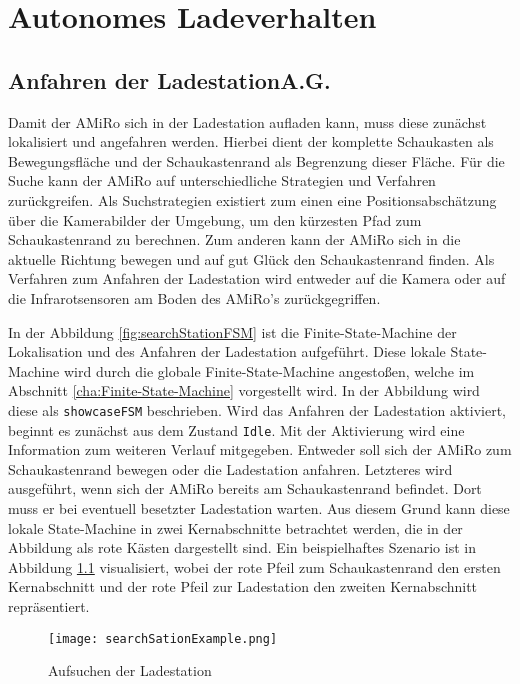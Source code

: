\chapter{Autonomes Ladeverhalten} \label{kap:AutonomesLadeverhalten}

\section[Anfahren der Ladestation]{Anfahren der Ladestation\hfill {\normalsize A.G.}} %

Damit der AMiRo sich in der Ladestation aufladen kann, muss diese zunächst lokalisiert und angefahren werden. Hierbei dient der komplette Schaukasten als Bewegungsfläche und der Schaukastenrand als Begrenzung dieser Fläche. Für die Suche kann der AMiRo auf unterschiedliche Strategien und Verfahren zurückgreifen. Als Suchstrategien existiert zum einen eine Positionsabschätzung über die Kamerabilder der Umgebung, um den kürzesten Pfad zum Schaukastenrand zu berechnen. Zum anderen kann der AMiRo sich in die aktuelle Richtung bewegen und auf gut Glück den Schaukastenrand finden. Als Verfahren zum Anfahren der Ladestation wird entweder auf die Kamera oder auf die Infrarotsensoren am Boden des AMiRo's zurückgegriffen.

In der Abbildung \ref{fig:searchStationFSM} ist die Finite-State-Machine der Lokalisation und des Anfahren der Ladestation aufgeführt. Diese lokale State-Machine wird durch die globale Finite-State-Machine angestoßen, welche im Abschnitt \ref{cha:Finite-State-Machine} vorgestellt wird. In der Abbildung wird diese als \texttt{showcaseFSM} beschrieben. Wird das Anfahren der Ladestation aktiviert, beginnt es zunächst aus dem Zustand \texttt{Idle}. Mit der Aktivierung wird eine Information zum weiteren Verlauf mitgegeben. Entweder soll sich der AMiRo zum Schaukastenrand bewegen oder die Ladestation anfahren. Letzteres wird ausgeführt, wenn sich der AMiRo bereits am Schaukastenrand befindet. Dort muss er bei eventuell besetzter Ladestation warten. Aus diesem Grund kann diese lokale State-Machine in zwei Kernabschnitte betrachtet werden, die in der Abbildung als rote Kästen dargestellt sind. Ein beispielhaftes Szenario ist in Abbildung \ref{fig:searchStationExample} visualisiert, wobei der rote Pfeil zum Schaukastenrand den ersten Kernabschnitt und der rote Pfeil zur Ladestation den zweiten Kernabschnitt repräsentiert.

\begin{figure}[H]
	\begin{center}
		\texttt{[image: searchSationExample.png]} 	
		\caption{Aufsuchen der Ladestation}
		\label{fig:searchStationExample}
	\end{center}
\end{figure}

